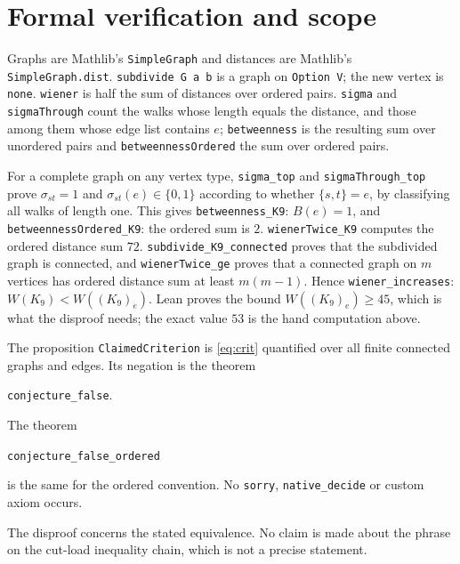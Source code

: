 \documentclass[11pt]{article}
\theoremstyle{remark}
\begin{document}
\section*{Formal verification and scope}
Graphs are Mathlib's \texttt{SimpleGraph} and distances are Mathlib's
\texttt{SimpleGraph.dist}. \texttt{subdivide G a b} is a graph on
\texttt{Option V}; the new vertex is \texttt{none}.
\texttt{wiener} is half the sum of distances over ordered pairs.
\texttt{sigma} and \texttt{sigmaThrough} count the walks whose length
equals the distance, and those among them whose edge list contains
$e$; \texttt{betweenness} is the resulting sum over unordered pairs and
\texttt{betweennessOrdered} the sum over ordered pairs.

For a complete graph on any vertex type, \texttt{sigma\_top} and
\texttt{sigmaThrough\_top} prove $\sigma_{st}=1$ and
$\sigma_{st}(e)\in\{0,1\}$ according to whether $\{s,t\}=e$, by
classifying all walks of length one. This gives
\texttt{betweenness\_K9}: $B(e)=1$, and
\texttt{betweennessOrdered\_K9}: the ordered sum is $2$.
\texttt{wienerTwice\_K9} computes the ordered distance sum $72$.
\texttt{subdivide\_K9\_connected} proves that the subdivided graph is
connected, and \texttt{wienerTwice\_ge} proves that a connected graph
on $m$ vertices has ordered distance sum at least $m(m-1)$. Hence
\texttt{wiener\_increases}: $W(K_9)<W((K_9)_e)$. Lean proves the bound
$W((K_9)_e)\ge45$, which is what the disproof needs; the exact value
$53$ is the hand computation above.

The proposition \texttt{ClaimedCriterion} is \eqref{eq:crit} quantified
over all finite connected graphs and edges. Its negation is the theorem
\begin{center}\small\texttt{conjecture\_false}.\end{center}
The theorem
\begin{center}\small\texttt{conjecture\_false\_ordered}\end{center}
is the same for the ordered convention. No \texttt{sorry},
\texttt{native\_decide} or custom axiom occurs.

The disproof concerns the stated equivalence. No claim is made about
the phrase on the cut-load inequality chain, which is not a precise
statement.
\end{document}
